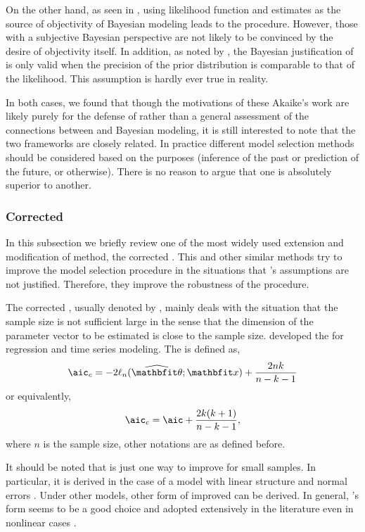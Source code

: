 \documentclass[10pt, hyper, bib, fontset=Lucida,
linespread=1.3, typearearatio=0.75]{marticle}
\begin{document}
On the other hand, as seen in \textcite{Akaike:1980gh}, using likelihood
function and \aic estimates as the source of objectivity of Bayesian
modeling leads to the \bic procedure. However, those with a subjective
Bayesian perspective are not likely to be convinced by the desire of
objectivity itself. In addition, as noted by \textcite{Kass:1995vb}, the
Bayesian justification of \aic is only valid when the precision of the prior
distribution is comparable to that of the likelihood. This assumption is
hardly ever true in reality.

In both cases, we found that though the motivations of these Akaike's work are
likely purely for the defense of \aic rather than a general assessment of the
connections between \aic and Bayesian modeling, it is still interested to note
that the two frameworks are closely related. In practice different model
selection methods should be considered based on the purposes (inference of the
past or prediction of the future, or otherwise). There is no reason to argue
that one is absolutely superior to another.

\subsubsection{Corrected \protect\aic}
\label{ssub:Corrected aic}

In this subsection we briefly review one of the most widely used extension and
modification of \aic method, the corrected \aic. This and other similar
methods try to improve the model selection procedure in the situations that
\textcite{Akaike:1973uc}'s assumptions are not justified. Therefore, they improve
the robustness of the \aic procedure.

The corrected \aic, usually denoted by \aicc, mainly deals with the situation
that the sample size is not sufficient large in the sense that the dimension
of the parameter vector to be estimated is close to the sample size.
\textcite{Hurvich:1989ev} developed the \aicc for regression and time series
modeling. The \aicc is defined as,
\begin{equation}
  \text{\aicc} = -2\ell_n(\hbth;\bfx) + \frac{2nk}{n-k-1}
\end{equation}
or equivalently,
\begin{equation}
  \text{\aicc} = \text{\aic} + \frac{2k(k+1)}{n-k-1},
\end{equation}
where $n$ is the sample size, other notations are as defined before.

It should be noted that \aicc is just one way to improve \aic for small
samples. In particular, it is derived in the case of a model with linear
structure and normal errors \parencite{Hurvich:1989ev, Burnham:2002wc}. Under
other models, other form of improved \aic can be derived. In general,
\textcite{Hurvich:1989ev}'s form seems to be a good choice and adopted
extensively in the literature even in nonlinear cases
\parencite[e.g.][]{Turkheimer:2003iy}.
\end{document}
